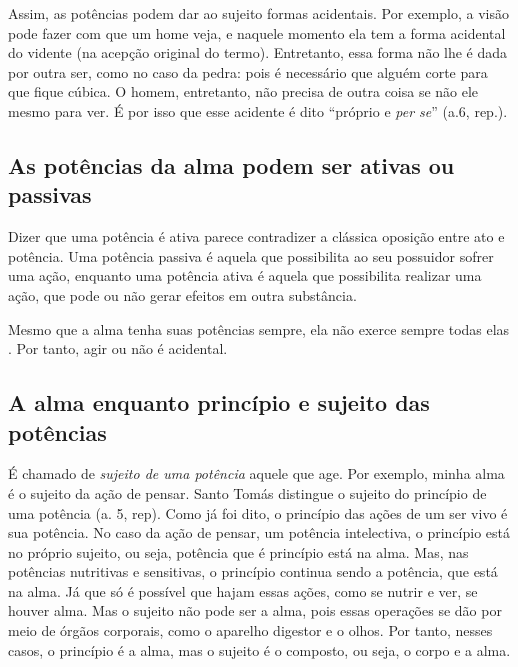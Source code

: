 \documentclass[
	article,			%
	12pt,				%
	oneside,			%
	a4paper,			%
	english,			%
	brazil,				%
	sumario=tradicional,
	doublespacing
	]{abntex2}
\begin{document}
Assim, as potências podem dar ao sujeito formas acidentais. Por exemplo, a visão pode fazer com que um home veja, e naquele momento ela tem a forma acidental do vidente (na acepção original do termo). Entretanto, essa forma não lhe é dada por outra ser, como no caso da pedra: pois é necessário que alguém corte para que fique cúbica. O homem, entretanto, não precisa de outra coisa se não ele mesmo para ver. É por isso que esse acidente é dito ``próprio e \textit{per se}'' (a.6, rep.). 


\subsection{As potências da alma podem ser ativas ou passivas}

Dizer que uma potência é ativa parece contradizer a clássica oposição entre ato e potência.
Uma potência passiva é aquela que possibilita ao seu possuidor sofrer uma ação, enquanto uma potência 
ativa é aquela que possibilita realizar uma ação, que pode ou não gerar efeitos em outra substância.

Mesmo que a alma tenha suas potências sempre, ela não exerce sempre todas elas \cite{field_st._1984}. Por tanto, agir ou não é acidental.






\subsection{A alma enquanto princípio e sujeito das potências}

É chamado de \emph{sujeito de uma potência} aquele que age. Por exemplo, minha alma é o sujeito da ação de pensar. Santo Tomás distingue o sujeito do princípio de uma potência (a. 5, rep). Como já foi dito, o princípio das ações de um ser vivo é sua potência. No caso da ação de pensar, um potência intelectiva, o princípio está no próprio sujeito, ou seja, potência que é princípio está na alma. Mas, nas potências nutritivas e sensitivas, o princípio continua sendo a potência, que está na alma. Já que só é possível que hajam essas ações, como se nutrir e ver, se houver alma. Mas o sujeito não pode ser a alma, pois essas operações se dão por meio de órgãos corporais, como o aparelho digestor e o olhos. Por tanto, nesses casos, o princípio é a alma, mas o sujeito é o composto, ou seja, o corpo e a alma.
\end{document}
